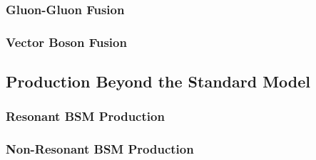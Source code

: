 \subsubsection{Gluon-Gluon Fusion}
        \subsubsection{Vector Boson Fusion}
    \subsection{Production Beyond the Standard Model}
        \subsubsection{Resonant BSM Production}
        \subsubsection{Non-Resonant BSM Production}

